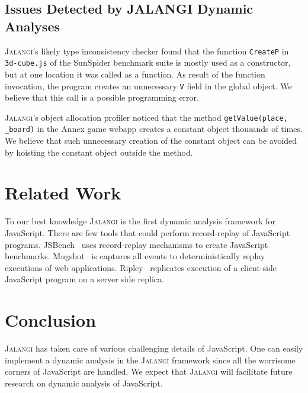 \documentclass{sig-alternate}
\def\jalangi{\textsc{Jalangi}}
\begin{document}
\subsection{Issues Detected by JALANGI Dynamic Analyses}
\label{sec:issu-detect-dynam}

\jalangi{}'s likely type inconsistency checker found that the function
\texttt{CreateP} in \texttt{3d-cube.js} of the SunSpider benchmark
suite is mostly used as a constructor, but at one location it was
called as a function.  As result of the function invocation, the
program creates an unnecessary \texttt{V} field in the global object.
We believe that this call is a possible programming error.

\jalangi{}'s object allocation profiler noticed that the method
\texttt{getValue(place, \_board)} in the Annex game webapp creates a
constant object thousands of times.  We believe that such unnecessary
creation of the constant object can be avoided by hoisting the
constant object outside the method.


\section{Related Work}
\label{sec:related-work}

To our best knowledge \jalangi{} is the first dynamic analysis
framework for JavaScript.  There are few tools that could perform
record-replay of JavaScript programs.
JSBench~\cite{Richards:2011:ACJ:2048066.2048119} uses record-replay
mechanisms to create JavaScript benchmarks.
Mugshot~\cite{Mickens:2010:MDC:1855711.1855722} is captures all events
to deterministically replay executions of web applications.
Ripley~\cite{Vikram:2009:RAS:1653662.1653685} replicates execution of
a client-side JavaScript program on a server side replica.


\section{Conclusion}
\label{sec:conclusion}

\jalangi{} has taken care of various challenging details of JavaScript.  One
can easily implement a dynamic analysis in the \jalangi{} framework
since all the worrisome corners of JavaScript are handled.  We expect that
\jalangi{} will facilitate future research on dynamic analysis of
JavaScript. 
\end{document}
